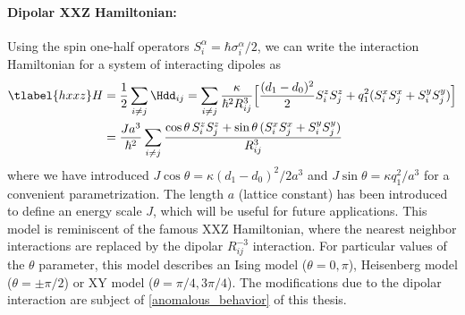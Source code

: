 \paragraph{Dipolar XXZ Hamiltonian:}
Using the spin one-half operators $S^\alpha_i = \hbar \sigma^\alpha_i/2$, we can write the interaction Hamiltonian for a system of interacting dipoles as
\begin{align} \tlabel{hxxz}
    H &= \frac{1}{2} \sum_{i\ne j} \Hdd_{ij} = \sum_{i\ne j} \frac{\kappa}{\hbar^2 R_{ij}^3} \Big[ \frac{(d_1-d_0)^2}{2} S^z_i S^z_j  + q_1^2 (S^x_i S^x_j + S^y_i S^y_j) \Big] \\
         &= \frac{Ja^3}{\hbar^2} \sum_{i\ne j} \frac{\cos\theta\, S^z_i S^z_j  + \sin\theta\, (S^x_i S^x_j + S^y_i S^y_j)}{R_{ij}^3}
\end{align}
where we have introduced $J\cos\theta = \kappa (d_1-d_0)^2/2a^3$ and $J\sin\theta = \kappa q_1^2/a^3$ for a convenient parametrization.
The length $a$ (lattice constant) has been introduced to define an energy scale $J$, which will be useful for future applications.
This model is reminiscent of the famous XXZ Hamiltonian, where the nearest neighbor interactions are replaced by the dipolar $R_{ij}^{-3}$ interaction. For particular values of the $\theta$ parameter, this model describes an Ising model ($\theta = 0, \pi$), Heisenberg model ($\theta=\pm \pi/2$) or XY model ($\theta=\pi/4, 3\pi/4$). The modifications due to the dipolar interaction are subject of \cref{anomalous_behavior} of this thesis.

